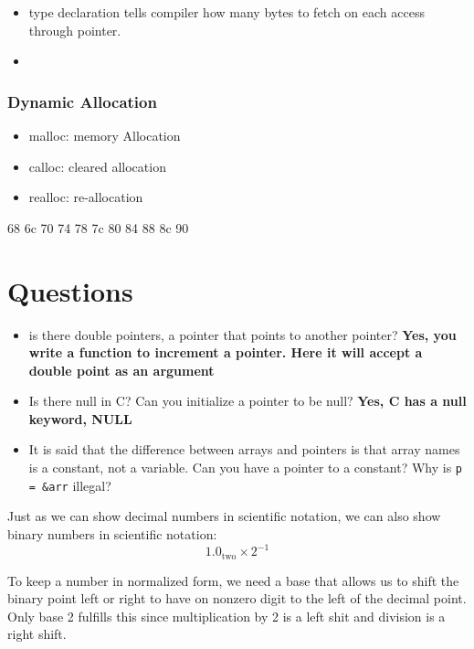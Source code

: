 \documentclass[12pt]{article}
\begin{document}
\begin{itemize}
    \item type declaration tells compiler how many bytes to fetch on each access through pointer.
    \item
\end{itemize}

\subsubsection*{Dynamic Allocation}
\begin{itemize}
    \item malloc: memory Allocation
    \item calloc: cleared allocation
    \item realloc: re-allocation
\end{itemize}


68 6c 70 74 78 7c 80 84 88 8c 90





\section*{Questions}
\begin{itemize}
    \item is there double pointers, a pointer that points to another pointer? \textbf{Yes, you write a function to increment a pointer. Here it will accept a double point as an argument}
    \item Is there null in C? Can you initialize a pointer to be null? \textbf{Yes, C has a null keyword, NULL}
    \item It is said that the difference between arrays and pointers is that array names is a constant, not a variable. Can you have a pointer to a constant? Why is \lstinline{p = &arr} illegal?

\end{itemize}




Just as we can show decimal numbers in scientific notation, we can also show binary numbers in scientific notation:
$$
    1.0_{\text{two}} \times 2^{-1}
$$

To keep a number in normalized form, we need a base that allows us to shift the binary point left or right to have on nonzero digit to the left of the decimal point. Only base 2 fulfills this since multiplication by 2 is a left shit and division is a right shift.
\end{document}

